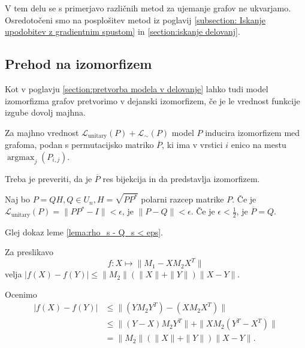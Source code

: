 \documentclass[mat2, tisk]{fmfdelo}
\newcommand{\loss}{\mathcal L}
\newcommand{\Loss}[1]{\mathcal L _\text{#1}}
\begin{document}
V tem delu se s primerjavo različnih metod za ujemanje
grafov ne ukvarjamo.
Osredotočeni smo na posplošitev metod iz poglavij
\ref{subsection: Iskanje upodobitev z gradientnim spustom} in
\ref{section:iskanje delovanj}.
%
\subsection{Prehod na izomorfizem}
\label{section:prehod na izomorfizen vanilla}
Kot v poglavju
\ref{section:pretvorba modela v delovanje} lahko tudi model
izomorfizma grafov pretvorimo v dejanski izomorfizem, če je le
vrednost funkcije izgube dovolj majhna.
\begin{definicija}
  Za majhno vrednost $\Loss{unitary}(P) + \loss_\sim(P)$
  model $P$ inducira izomorfizem med grafoma, podan s permutacijsko
  matriko $\overline{P}$, ki ima v vrstici $i$ enico na mestu
  $\operatorname{argmax}_j (P_{i,j})$.
\end{definicija}
Treba je preveriti, da je $\overline{P}$ res bijekcija in
da predstavlja izomorfizem.
%
\begin{lema}
  \label{lema:loss unitary mali -> P blizu P streha}
  Naj bo $P=QH, Q \in U_n, H= \sqrt{PP^*}$ polarni razcep
  matrike $P$.
  Če je  $\Loss{unitary}(P)
  = \|P P^* - I\| < \epsilon$,
  je $\|P-Q \| < \epsilon$. Če je $\epsilon < \frac{1}{2}$,
  je $\overline{P} = Q$.
\end{lema}
\begin{dokaz}
  Glej dokaz leme
  \ref{lema:rho_s - Q_s < eps}.
\end{dokaz}
\begin{lema}
  \label{lema:ocena-za-graph-matching}
  Za preslikavo
  $$f \colon X \mapsto \| M_1 - X M_2 X^T \|$$
  velja
  $|f(X) - f(Y)| \leq
  \|M_2\|(\|X\| + \|Y\|) \|X - Y\|$.
\end{lema}
\begin{dokaz}
  Ocenimo
  \begin{align*}
    |f(X) - f(Y)|
    &\leq \| (Y M_2 Y^T) - (X M_2 X^T) \| \\
    &\leq \|(Y - X) M_2 Y^T\| + \|X M_2 (Y^T - X^T)\| \\
    &= \|M_2\| (\|X\| + \|Y\|) \|X - Y\|.
  \end{align*}
\end{dokaz}
\end{document}
